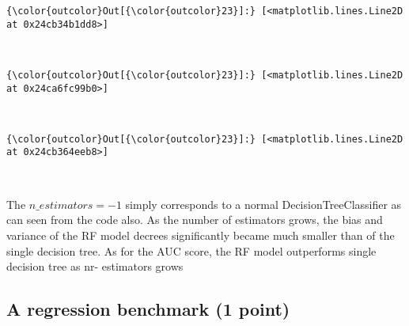 \documentclass[11pt]{article}
\begin{document}
            \begin{Verbatim}[commandchars=\\\{\}]
{\color{outcolor}Out[{\color{outcolor}23}]:} [<matplotlib.lines.Line2D at 0x24cb34b1dd8>]
\end{Verbatim}
        
    \begin{center}
    \end{center}
    { \hspace*{\fill} \\}
    
            \begin{Verbatim}[commandchars=\\\{\}]
{\color{outcolor}Out[{\color{outcolor}23}]:} [<matplotlib.lines.Line2D at 0x24ca6fc99b0>]
\end{Verbatim}
        
    \begin{center}
    \end{center}
    { \hspace*{\fill} \\}
    
            \begin{Verbatim}[commandchars=\\\{\}]
{\color{outcolor}Out[{\color{outcolor}23}]:} [<matplotlib.lines.Line2D at 0x24cb364eeb8>]
\end{Verbatim}
        
    \begin{center}
    \end{center}
    { \hspace*{\fill} \\}
    
    The \(n\_estimators=-1\) simply corresponds to a normal
DecisionTreeClassifier as can seen from the code also. As the number of
estimators grows, the bias and variance of the RF model decrees
significantly became much smaller than of the single decision tree. As
for the AUC score, the RF model outperforms single decision tree as nr-
estimators grows

    \subsection{A regression benchmark (1
point)}\label{a-regression-benchmark-1-point}
\end{document}
